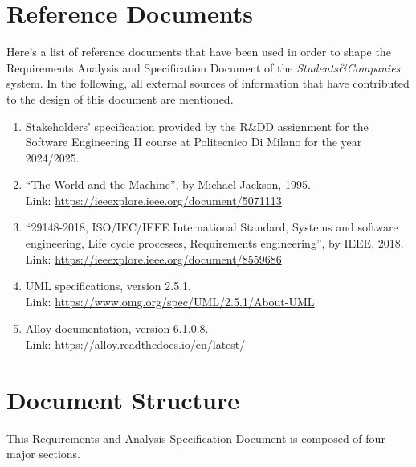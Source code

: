 \newpage
\section{Reference Documents}

Here’s a list of reference documents that have been used in order to shape the Requirements Analysis and Specification Document of the \textit{Students\&Companies} system. In the following, all external sources of information that have contributed to the design of this document are mentioned.

\begin{enumerate}
    \item Stakeholders’ specification provided by the R\&DD assignment for the Software Engineering II course at Politecnico Di Milano for the year 2024/2025.
    \item ``The World and the Machine'', by Michael Jackson, 1995. \\
    Link: \url{https://ieeexplore.ieee.org/document/5071113}
    \item ``29148-2018, ISO/IEC/IEEE International Standard, Systems and software engineering, Life cycle processes, Requirements engineering'', by IEEE, 2018. \\
    Link: \url{https://ieeexplore.ieee.org/document/8559686}
    \item UML specifications, version 2.5.1. \\
    Link: \url{https://www.omg.org/spec/UML/2.5.1/About-UML}
    \item Alloy documentation, version 6.1.0.8. \\
    Link: \url{https://alloy.readthedocs.io/en/latest/}
\end{enumerate}

\newpage
\section{Document Structure}

This Requirements and Analysis Specification Document is composed of four major sections.

